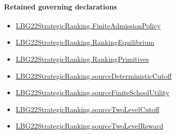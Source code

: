 \documentclass[10pt]{article}
\begin{document}
\paragraph{Retained governing declarations}
\begin{itemize}\raggedright
\item \hyperlink{paper-prerequisite-d056dd7c8060653c}{LBG22\allowbreak{}Strategic\allowbreak{}Ranking.\allowbreak{}Finite\allowbreak{}Admission\allowbreak{}Policy}
\item \hyperlink{paper-prerequisite-2a1b692f4e3136c6}{LBG22\allowbreak{}Strategic\allowbreak{}Ranking.\allowbreak{}Ranking\allowbreak{}Equilibrium}
\item \hyperlink{paper-prerequisite-9bbcc12f4a1736bf}{LBG22\allowbreak{}Strategic\allowbreak{}Ranking.\allowbreak{}Ranking\allowbreak{}Primitives}
\item \hyperlink{paper-prerequisite-e76c8574ddaca0dc}{LBG22\allowbreak{}Strategic\allowbreak{}Ranking.\allowbreak{}source\allowbreak{}Deterministic\allowbreak{}Cutoff}
\item \hyperlink{paper-prerequisite-25a6dc17f260546b}{LBG22\allowbreak{}Strategic\allowbreak{}Ranking.\allowbreak{}source\allowbreak{}Finite\allowbreak{}School\allowbreak{}Utility}
\item \hyperlink{paper-prerequisite-f88aac58507e44ca}{LBG22\allowbreak{}Strategic\allowbreak{}Ranking.\allowbreak{}source\allowbreak{}Two\allowbreak{}Level\allowbreak{}Cutoff}
\item \hyperlink{paper-prerequisite-30d97cd43eb79017}{LBG22\allowbreak{}Strategic\allowbreak{}Ranking.\allowbreak{}source\allowbreak{}Two\allowbreak{}Level\allowbreak{}Reward}
\end{itemize}
\end{document}
